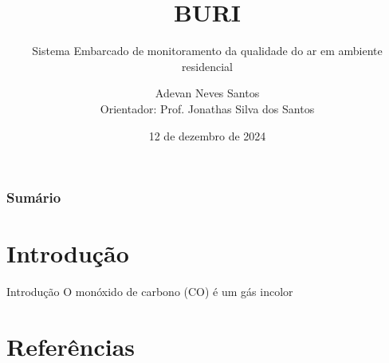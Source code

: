 \documentclass[12pt]{beamer}
\title{BURI}
\subtitle{Sistema Embarcado de monitoramento da qualidade do ar em ambiente residencial}
\author{Adevan Neves Santos \\ Orientador: Prof. Jonathas Silva dos Santos}
\date{12 de dezembro de 2024}
\begin{document}
    \maketitle

    \begin{frame}
        \frametitle{Sumário}
        \tableofcontents
    \end{frame}

    \section{Introdução}

    \begin{frame}{Introdução}
         O monóxido de carbono (CO) é um gás incolor 
    \end{frame}

    \section{Referências}
    
    \printbibliography
\end{document}
